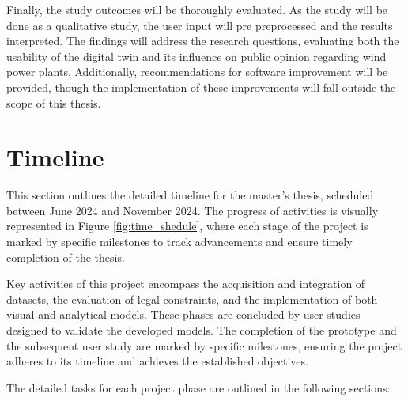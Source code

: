 \documentclass[11pt, titlepage, a4paper]{scrartcl}
\begin{document}
\begin{linenumbers}
    Finally, the study outcomes will be thoroughly evaluated. As the study will be done as a qualitative study, the user input will pre preprocessed and the results interpreted. The findings will address the research questions, evaluating both the usability of the digital twin and its influence on public opinion regarding wind power plants. Additionally, recommendations for software improvement will be provided, though the implementation of these improvements will fall outside the scope of this thesis.


    \section{Timeline}
    This section outlines the detailed timeline for the master's thesis, scheduled between June 2024 and November 2024.
    The progress of activities is visually represented in Figure \ref{fig:time_shedule}, where each stage of the project is marked by specific milestones to track advancements and ensure timely completion of the thesis.


    Key activities of this project encompass the acquisition and integration of datasets, the evaluation of legal constraints, and the implementation of both visual and analytical models. These phases are concluded by user studies designed to validate the developed models. The completion of the prototype and the subsequent user study are marked by specific milestones, ensuring the project adheres to its timeline and achieves the established objectives.

    The detailed tasks for each project phase are outlined in the following sections:


\end{linenumbers}
\end{document}
